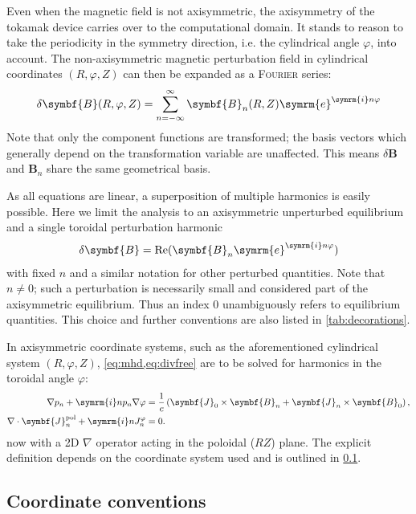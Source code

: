 \documentclass[a4paper, twoside, 10pt, english]{article}
\numberwithin{equation}{section}
\let\temp\varrho
\let\varrho\rho
\let\rho\temp
\let\temp\vartheta
\let\vartheta\theta
\let\theta\temp
\let\temp\varphi
\let\varphi\phi
\let\phi\temp
\let\vec\symbf
\DeclareMathOperator\Real{Re}
\newcommand*\grad{\ensuremath{\nabla}}
\newcommand*\divg{\ensuremath{\nabla \cdot}}
\newcommand*\e{\ensuremath{\symrm{e}}}  %
\newcommand*\im{\ensuremath{\symrm{i}}}  %
\newcommand*\pol{\ensuremath{\textrm{pol}}}  %
\newcommand*\Bpert{\ensuremath{\delta \vec{B}}}  %
\begin{document}
Even when the magnetic field is not axisymmetric, the axisymmetry of the tokamak device carries over to the computational domain. It stands to reason to take the periodicity in the symmetry direction, i.e. the cylindrical angle $\phi$, into account. The non-axisymmetric magnetic perturbation field in cylindrical coordinates $(R, \phi, Z)$ can then be expanded as a \textsc{Fourier} series:
\begin{gather}
  \Bpert (R, \phi, Z) = \sum_{n = -\infty}^{\infty} \vec{B}_{n} (R, Z) \e^{\im n \phi}
\end{gather}
Note that only the component functions are transformed; the basis vectors which generally depend on the transformation variable are unaffected. This means $\Bpert$ and $\vec{B}_{n}$ share the same geometrical basis.

As all equations are linear, a superposition of multiple harmonics is easily possible. Here we limit the analysis to an axisymmetric unperturbed equilibrium and a single toroidal perturbation harmonic
\begin{gather}
  \Bpert = \Real (\vec{B}_{n} \e^{\im n \phi})
\end{gather}
with fixed $n$ and a similar notation for other perturbed quantities. Note that $n \neq 0$; such a perturbation is necessarily small and considered part of the axisymmetric equilibrium. Thus an index $0$ unambiguously refers to equilibrium quantities. This choice and further conventions are also listed in \cref{tab:decorations}.

In axisymmetric coordinate systems, such as the aforementioned cylindrical system $(R, \phi, Z)$, \cref{eq:mhd,eq:divfree} are to be solved for harmonics in the toroidal angle $\phi$:
\begin{align}
  \grad p_{n} + \im n p_{n} \grad \phi &= \frac{1}{c} \left( \vec{J}_{0} \times \vec{B}_{n} + \vec{J}_{n} \times \vec{B}_{0} \right), \label{eq:mhd-phi} \\
  \divg \vec{J}_{n}^{\pol}+ \im n J_{n}^{\phi} &= 0. \label{eq:divfree-phi}
\end{align}
now with a 2D $\grad$ operator acting in the poloidal ($RZ$) plane. The explicit definition depends on the coordinate system used and is outlined in \cref{sec:cocos}.

\subsection{Coordinate conventions}
\label{sec:cocos}
\end{document}
